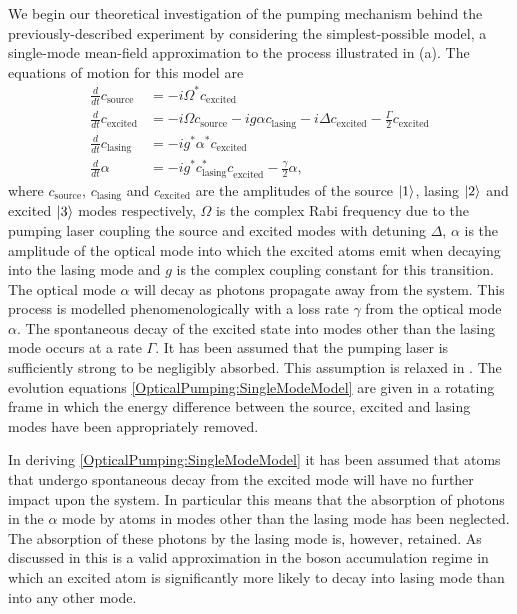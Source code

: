 We begin our theoretical investigation of the pumping mechanism behind the previously-described experiment by considering the simplest-possible model, a single-mode mean-field approximation to the process illustrated in (a).  The equations of motion for this model are
\begin{subequations}
    \label{OpticalPumping:SingleModeModel}
    \begin{align}
        \frac{d}{dt} c_\text{source} &= -i \Omega^* c_\text{excited} \\
        \frac{d }{dt}c_\text{excited} &= -i \Omega c_\text{source} -i g \alpha c_\text{lasing} - i \Delta c_\text{excited} - \frac{\Gamma}{2} c_\text{excited}\\
        \frac{d }{dt}c_\text{lasing} &= -i g^* \alpha^* c_\text{excited} \\
        \frac{d }{dt}\alpha &= -i g^* c_\text{lasing}^* c_\text{excited}^{\phantom{*}} - \frac{\gamma}{2} \alpha,
    \end{align} 
\end{subequations}
where $c_\text{source}$, $c_\text{lasing}$ and $c_\text{excited}$ are the amplitudes of the source ${\left|1\right>}$, lasing ${\left|2\right>}$ and excited ${\left|3\right>}$ modes respectively, $\Omega$ is the complex Rabi frequency due to the pumping laser coupling the source and excited modes with detuning $\Delta$, $\alpha$ is the amplitude of the optical mode into which the excited atoms emit when decaying into the lasing mode and $g$ is the complex coupling constant for this transition.  The optical mode $\alpha$ will decay as photons propagate away from the system.  This process is modelled phenomenologically with a loss rate $\gamma$ from the optical mode $\alpha$.  The spontaneous decay of the excited state into modes other than the lasing mode occurs at a rate $\Gamma$.  It has been assumed that the pumping laser is sufficiently strong to be negligibly absorbed.  This assumption is relaxed in .  The evolution equations \eqref{OpticalPumping:SingleModeModel} are given in a rotating frame in which the energy difference between the source, excited and lasing modes have been appropriately removed.

In deriving \eqref{OpticalPumping:SingleModeModel} it has been assumed that atoms that undergo spontaneous decay from the excited mode will have no further impact upon the system.  In particular this means that the absorption of photons in the $\alpha$ mode by atoms in modes other than the lasing mode has been neglected.  The absorption of these photons by the lasing mode is, however, retained.  As discussed in  this is a valid approximation in the boson accumulation regime in which an excited atom is significantly more likely to decay into lasing mode than into any other mode.

